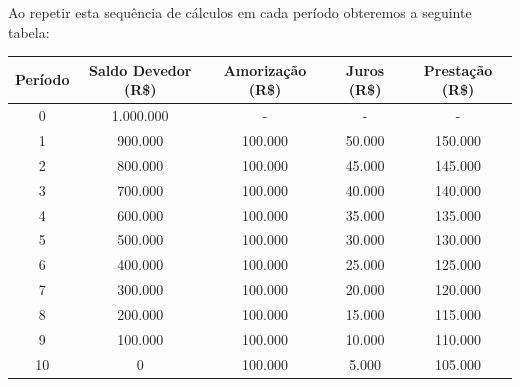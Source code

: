 \documentclass[a4paper, 12pt]{article}
\begin{document}
\begin{itemize}
  Ao repetir esta sequência de cálculos em cada período obteremos a seguinte tabela:\\
  \begin{tabular}{ | c | c | c | c | c |}
  \hline
  Período & Saldo Devedor (R\$) & Amorização (R\$) & Juros (R\$) & Prestação (R\$) \\ \hline
  0 & 1.000.000 & - & - & - \\ \hline
  1 &   900.000 & 100.000 & 50.000 & 150.000 \\ \hline
  2 &   800.000 & 100.000 & 45.000 & 145.000 \\ \hline
  3 &   700.000 & 100.000 & 40.000 & 140.000 \\ \hline
  4 &   600.000 & 100.000 & 35.000 & 135.000 \\ \hline
  5 &   500.000 & 100.000 & 30.000 & 130.000 \\ \hline
  6 &   400.000 & 100.000 & 25.000 & 125.000 \\ \hline
  7 &   300.000 & 100.000 & 20.000 & 120.000 \\ \hline
  8 &   200.000 & 100.000 & 15.000 & 115.000 \\ \hline
  9 &   100.000 & 100.000 & 10.000 & 110.000 \\ \hline
  10 &   0 & 100.000 & 5.000 & 105.000 \\ \hline  
  \end{tabular} \\\\
  

  
\end{itemize}
\end{document}
